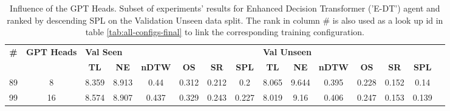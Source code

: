 \begin{table}
\centering
\caption{\label{tab:e_dt_heads}Influence of the GPT Heads. Subset of experiments' results for Enhanced Decision Transformer ('E-DT') agent and ranked by descending SPL on the Validation Unseen data split. The rank in column \# is also used as a look up id in table \ref{tab:all-configs-final} to link the corresponding training configuration.}
\begin{tabular}{@{\hskip3pt}c@{\hskip3pt}c@{\hskip3pt}c@{\hskip3pt}c@{\hskip3pt}c@{\hskip3pt}c@{\hskip3pt}c@{\hskip3pt}c@{\hskip3pt}c@{\hskip3pt}c@{\hskip3pt}c@{\hskip3pt}c@{\hskip3pt}c@{\hskip3pt}c@{\hskip3pt}c}
\toprule
\textbf{\#} & \textbf{GPT Heads} & \multicolumn{6}{l}{\textbf{Val Seen}} & \multicolumn{6}{l}{\textbf{Val Unseen}} \\
 \textbf{~} &         \textbf{~} &       \textbf{TL} & \textbf{NE} & \textbf{nDTW} & \textbf{OS} & \textbf{SR} & \textbf{SPL} &         \textbf{TL} & \textbf{NE} & \textbf{nDTW} & \textbf{OS} & \textbf{SR} & \textbf{SPL} \\
\midrule
         89 &                  8 &             8.359 &       8.913 &          0.44 &       0.312 &       0.212 &          0.2 &               8.065 &       9.644 &         0.395 &       0.228 &       0.152 &         0.14 \\
         99 &                 16 &             8.574 &       8.907 &         0.437 &       0.329 &       0.243 &        0.227 &               8.019 &        9.16 &         0.406 &       0.247 &       0.153 &        0.139 \\
\bottomrule
\end{tabular}
\end{table}
